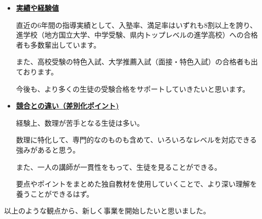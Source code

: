 ﻿\documentclass[12pt]{article}
\begin{document}
\begin{itemize}[leftmargin=1.5em, itemsep=3mm, parsep=4pt]
\newpage

\item \uline{\textbf{実績や経験値}}

直近の6年間の指導実績として、入塾率、満足率はいずれも8割以上を誇り、進学校（地方国立大学、中学受験、県内トップレベルの進学高校）への合格者も多数輩出しています。

また、高校受験の特色入試、大学推薦入試（面接・特色入試）の合格者も出ております。

今後も、より多くの生徒の受験合格をサポートしていきたいと思います。

\item \uline{\textbf{競合との違い（差別化ポイント)}}

経験上、数理が苦手となる生徒は多い。

数理に特化して、専門的なのものも含めて、いろいろなレベルを対応できる強みがあると思う。

また、一人の講師が一貫性をもって、生徒を見ることができる。

要点やポイントをまとめた独自教材を使用していくことで、より深い理解を養うことができるはず。
\end{itemize}

以上のような観点から、新しく事業を開始したいと思いました。
\end{document}

